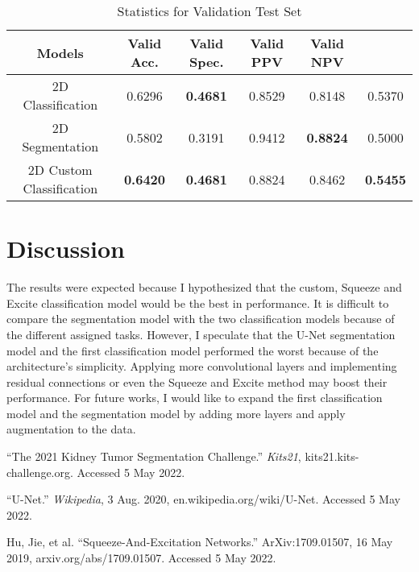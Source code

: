 \documentclass [12pt, letterpaper] {article}
\begin{document}
\begin{table}[h!]
\centering
\small
\begin{tabular}{ c c c c c c } 
 \hline
 Models & Valid Acc. & Valid Spec. & Valid PPV & Valid NPV \\  [0.5ex] 
 \hline
 2D Classification & 0.6296 & \textbf{0.4681} & 0.8529 & 0.8148 & 0.5370 \\
 2D Segmentation & 0.5802 & 0.3191 & 0.9412 & \textbf{0.8824} & 0.5000 \\
 2D Custom Classification & \textbf{0.6420} & \textbf{0.4681} & 0.8824 & 0.8462 & \textbf{0.5455}\\

\hline
\end{tabular}

\caption{Statistics for Validation Test Set}
\label{table:data}
\end{table}


\section{Discussion}
The results were expected because I hypothesized that the custom, Squeeze and Excite classification model would be the best in performance. It is difficult to compare the segmentation model with the two classification models because of the different assigned tasks. However, I speculate that the U-Net segmentation model and the first classification model performed the worst because of the architecture's simplicity. Applying more convolutional layers and implementing residual connections or even the Squeeze and Excite method may boost their performance. For future works, I would like to expand the first classification model and the segmentation model by adding more layers and apply augmentation to the data. 


\begin{thebibliography}{2}
“The 2021 Kidney Tumor Segmentation Challenge.” \emph{Kits21}, kits21.kits-challenge.org. Accessed 5 May 2022.

“U-Net.” \emph{Wikipedia}, 3 Aug. 2020, en.wikipedia.org/wiki/U-Net. Accessed 5 May 2022.

Hu, Jie, et al. “Squeeze-And-Excitation Networks.” ArXiv:1709.01507, 16 May 2019, arxiv.org/abs/1709.01507. Accessed 5 May 2022.
\end{thebibliography}
\end{document}
